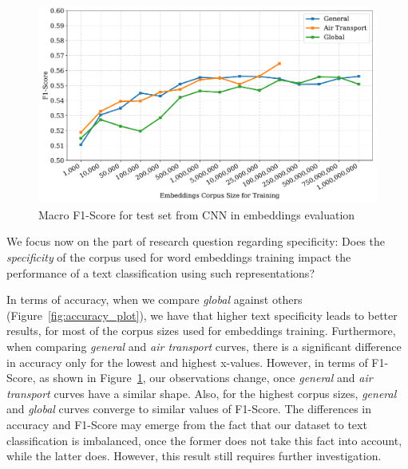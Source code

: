 \begin{figure}[htb]
    \centering
    \caption{Macro F1-Score for test set from CNN  in embeddings evaluation}
    \label{fig:f1_plot}
    \includegraphics[width=\textwidth]{images/chapters/f1_score_mean_final.pdf}
    
\end{figure}


We focus now on the part of research question regarding specificity: Does the \textit{specificity}  of the corpus used for word embeddings training impact the performance of a text classification using such representations? 

In terms of accuracy, when we compare \emph{global} against others (Figure~\ref{fig:accuracy_plot}), we have that higher text specificity leads to better results, for most of the corpus sizes used for embeddings training. Furthermore, when comparing \emph{general} and \emph{air transport} curves, there is a significant difference in accuracy only for the lowest and highest x-values. 
However, in terms of F1-Score, as shown in Figure~\ref{fig:f1_plot}, our observations change, once \emph{general} and \emph{air transport} curves have a similar shape. Also, for the highest corpus sizes, \emph{general} and \emph{global} curves converge to similar values of F1-Score. 
%
The differences in accuracy and F1-Score may emerge from the fact that our dataset to text classification is imbalanced, once the former does not take this fact into account, while the latter does. However, this result still requires further investigation. 


